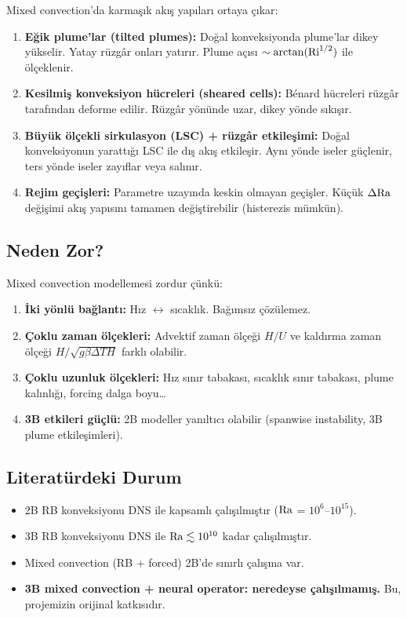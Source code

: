 Mixed convection'da karmaşık akış yapıları ortaya çıkar:

\begin{enumerate}
    \item \textbf{Eğik plume'lar (tilted plumes):} Doğal konveksiyonda plume'lar dikey yükselir. Yatay rüzgâr onları yatırır. Plume açısı $\sim \arctan(\mathrm{Ri}^{1/2})$ ile ölçeklenir.

    \item \textbf{Kesilmiş konveksiyon hücreleri (sheared cells):} Bénard hücreleri rüzgâr tarafından deforme edilir. Rüzgâr yönünde uzar, dikey yönde sıkışır.

    \item \textbf{Büyük ölçekli sirkulasyon (LSC) + rüzgâr etkileşimi:} Doğal konveksiyonun yarattığı LSC ile dış akış etkileşir. Aynı yönde iseler güçlenir, ters yönde iseler zayıflar veya salınır.

    \item \textbf{Rejim geçişleri:} Parametre uzayında keskin olmayan geçişler. Küçük $\Delta\mathrm{Ra}$ değişimi akış yapısını tamamen değiştirebilir (histerezis mümkün).
\end{enumerate}

\subsection{Neden Zor?}

Mixed convection modellemesi zordur çünkü:
\begin{enumerate}
    \item \textbf{İki yönlü bağlantı:} Hız $\leftrightarrow$ sıcaklık. Bağımsız çözülemez.
    \item \textbf{Çoklu zaman ölçekleri:} Advektif zaman ölçeği $H/U$ ve kaldırma zaman ölçeği $H/\sqrt{g\beta\Delta T H}$ farklı olabilir.
    \item \textbf{Çoklu uzunluk ölçekleri:} Hız sınır tabakası, sıcaklık sınır tabakası, plume kalınlığı, forcing dalga boyu\ldots
    \item \textbf{3B etkileri güçlü:} 2B modeller yanıltıcı olabilir (spanwise instability, 3B plume etkileşimleri).
\end{enumerate}

\subsection{Literatürdeki Durum}

\begin{itemize}
    \item 2B RB konveksiyonu DNS ile kapsamlı çalışılmıştır ($\mathrm{Ra}$ = $10^6$--$10^{15}$).
    \item 3B RB konveksiyonu DNS ile $\mathrm{Ra} \lesssim 10^{10}$ kadar çalışılmıştır.
    \item Mixed convection (RB + forced) 2B'de sınırlı çalışma var.
    \item \textbf{3B mixed convection + neural operator: neredeyse çalışılmamış.} Bu, projemizin orijinal katkısıdır.
\end{itemize}


